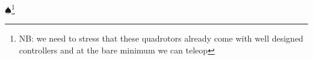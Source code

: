 \documentclass[letterpaper, 10 pt, conference]{ieeeconf}  %
\newcommand\NB[1]{$\spadesuit$\footnote{NB: #1}}
\begin{document}
%
%

\NB{we need to stress that these quadrotors already come with well designed controllers and at the bare minimum we can teleop }

\end{document}
